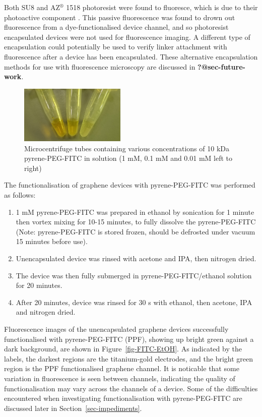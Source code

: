 \documentclass[
  a4paper,
]{scrbook}
\begin{document}
Both SU8 and AZ\(^\circledR\) 1518 photoresist were found to fluoresce,
which is due to their photoactive component \autocite{Pai2007}. This
passive fluorescence was found to drown out fluorescence from a
dye-functionalised device channel, and so photoresist encapsulated
devices were not used for fluorescence imaging. A different type of
encapsulation could potentially be used to verify linker attachment with
fluorescence after a device has been encapsulated. These alternative
encapsulation methods for use with fluorescence microscopy are discussed
in \textbf{?@sec-future-work}.

\begin{figure}

{\centering \includegraphics[width=0.45\textwidth,height=\textheight]{figures/ch6/PPF_vials.png}

}

\caption{\label{fig-PPF-concs}Microcentrifuge tubes containing various
concentrations of 10 kDa pyrene-PEG-FITC in solution (1 mM, 0.1 mM and
0.01 mM left to right)}

\end{figure}

The functionalisation of graphene devices with pyrene-PEG-FITC was
performed as follows:

\begin{enumerate}
\def\labelenumi{\arabic{enumi}.}
\item
  1 mM pyrene-PEG-FITC was prepared in ethanol by sonication for 1
  minute then vortex mixing for 10-15 minutes, to fully dissolve the
  pyrene-PEG-FITC (Note: pyrene-PEG-FITC is stored frozen, should be
  defrosted under vacuum 15 minutes before use).
\item
  Unencapsulated device was rinsed with acetone and IPA, then nitrogen
  dried.
\item
  The device was then fully submerged in pyrene-PEG-FITC/ethanol
  solution for 20 minutes.
\item
  After 20 minutes, device was rinsed for 30 s with ethanol, then
  acetone, IPA and nitrogen dried.
\end{enumerate}

Fluorescence images of the unencapsulated graphene devices successfully
functionalised with pyrene-PEG-FITC (PPF), showing up bright green
against a dark background, are shown in Figure~\ref{fig-FITC-EtOH}. As
indicated by the labels, the darkest regions are the titanium-gold
electrodes, and the bright green region is the PPF functionalised
graphene channel. It is noticable that some variation in fluorescence is
seen between channels, indicating the quality of functionalisation may
vary across the channels of a device. Some of the difficulties
encountered when investigating functionalisation with pyrene-PEG-FITC
are discussed later in Section~\ref{sec-impediments}.
\end{document}
